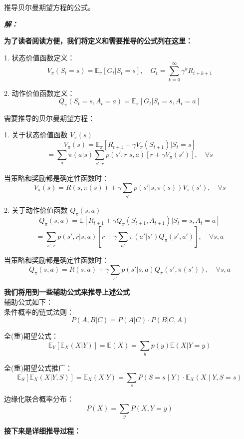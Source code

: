 \documentclass[12pt, a4paper]{article}
\newenvironment{solution}{
	\par\vspace{0.2cm}\noindent\textbf{\color{themecolor} \textit{解：}}
}{
	\par\vspace{0.5cm} %
}
\begin{document}
	\clearpage
	\begin{problem}[习题 35.4]
		推导贝尔曼期望方程的公式。
	\end{problem}
	
	\begin{solution}
		\textbf{为了读者阅读方便，我们将定义和需要推导的公式列在这里：}
		
		1. 状态价值函数定义：
		\[ V_{\pi}(S_t=s) = \mathbb{E}_{\pi}[G_t | S_t=s], \quad G_t = \sum_{k=0}^{\infty} \gamma^k R_{t+k+1} \]
		
		2. 动作价值函数定义：
		\[ Q_{\pi}(S_t=s, A_t=a) = \mathbb{E}_{\pi}[G_t | S_t=s, A_t=a] \]
		
		需要推导的贝尔曼期望方程：
		
		1. 关于状态价值函数 $V_{\pi}(s)$
		\[ V_{\pi}(s) = \mathbb{E}_{\pi}[R_{t+1} + \gamma V_{\pi}(S_{t+1}) | S_t=s] \]
		\[ = \sum_{a} \pi(a|s) \sum_{s',r} p(s',r|s,a) [r + \gamma V_{\pi}(s')], \quad \forall s \]
		
		当策略和奖励都是确定性函数时：
		\[ V_{\pi}(s) = R(s, \pi(s)) + \gamma \sum_{s'} p(s'|s, \pi(s)) V_{\pi}(s'), \quad \forall s \]
		
		2. 关于动作价值函数 $Q_{\pi}(s,a)$
		\[ Q_{\pi}(s,a) = \mathbb{E}[R_{t+1} + \gamma Q_{\pi}(S_{t+1}, A_{t+1}) | S_t=s, A_t=a] \]
		\[ = \sum_{s',r} p(s',r|s,a) \left[ r + \gamma \sum_{a'} \pi(a'|s') Q_{\pi}(s',a') \right], \quad \forall s,a \]
		
		当策略和奖励都是确定性函数时：
		\[ Q_{\pi}(s,a) = R(s,a) + \gamma \sum_{s'} p(s'|s,a) Q_{\pi}(s', \pi(s')), \quad \forall s,a \]
		
		\textbf{我们将用到一些辅助公式来推导上述公式}\\
		
		辅助公式如下：\\
		
		条件概率的链式法则：
		\[ P(A,B|C) = P(A|C) \cdot P(B|C,A) \]
		
		全(重)期望公式：
		\[ \mathbb{E}_Y[\mathbb{E}_X(X|Y)] = \mathbb{E}(X) = \sum_{y} p(y)\mathbb{E}(X|Y=y) \]
		
		全(重)期望公式推广：
		\[ \mathbb{E}_S[\mathbb{E}_X(X|Y,S)] = \mathbb{E}_X(X|Y)= \sum_{s} P(S = s \mid Y) \cdot \mathbb{E}_X(X \mid Y, S = s) \]
		
		边缘化联合概率分布：
		\[ P(X) = \sum_{y} P(X, Y=y) \]
		
		\textbf{接下来是详细推导过程：}
		

\end{solution}
\end{document}
